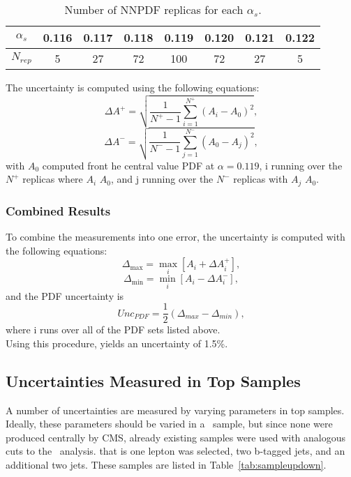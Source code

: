 \begin{table}[h]
\begin{center}

\begin{tabular}{c|ccccccc}\hline
$\alpha _s$         &  0.116 & 0.117 & 0.118 & 0.119 & 0.120 & 0.121 & 0.122 \\ \hline
$N_{rep}$                &  5         &  27      &  72      &   100   &  72     &   27    &    5       \\
\hline
\end{tabular}
\caption{\label{tab:nnPDFsets} Number of NNPDF replicas for each $\alpha _s$.}
\end{center}
\end{table}
The uncertainty is computed using the following equations:
\begin{equation}
\Delta A ^{+} = \sqrt{  \frac{1}{N^{+} - 1} \sum \limits_{i=1}^{N^{+}} (A_i - A_0)^2},
\end{equation}
\begin{equation}
\Delta A ^{-} = \sqrt{  \frac{1}{N^{-} - 1} \sum \limits_{j=1}^{N^{-}} (A_0 - A_j)^2},
\end{equation}
with $A_0$ computed front he central value PDF at $\alpha = 0.119$, i running over the $N^{+}$ replicas where $A_i$ \gt $A_0$, and j running over the $N^{-}$ replicas with $A_j$ \lt $A_0$.\\

\subsubsection{Combined Results}
To combine the measurements into one error, the uncertainty is computed with the following equations:
\begin{equation}
\Delta _{\max} = \underset{i}{\max}  [A_i + \Delta A^{+} _i],
\end{equation}
\begin{equation}
\Delta _{\min} = \underset{i}{\min}  [A_i - \Delta A^{-} _i],
\end{equation}
and the PDF uncertainty is
\begin{equation}
Unc_{PDF} = \frac{1}{2}(\Delta _{max} - \Delta _{min} ),
\end{equation}
where i runs over all of the PDF sets listed above.\\

Using this procedure, yields an uncertainty of 1.5\%.



\subsection{Uncertainties Measured in Top Samples}
A number of uncertainties are measured by varying parameters in top samples. Ideally, these parameters should be varied in a \ttZ \ sample, but since none were produced centrally by CMS, already existing \ttbar samples were used with analogous cuts to the \ttZ \ analysis. that is one lepton was selected, two b-tagged jets, and an additional two jets. These samples are listed in Table~\ref{tab:sampleupdown}.


